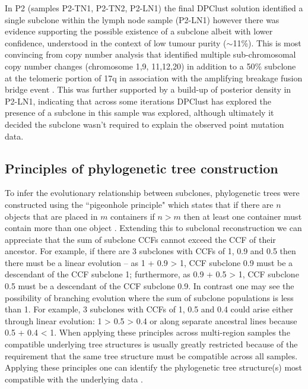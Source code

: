 In P2 (samples P2-TN1, P2-TN2, P2-LN1) the final DPClust solution identified a single subclone within the lymph node sample (P2-LN1) however there was evidence supporting the possible existence of a subclone albeit with lower confidence, understood in the context of low tumour purity ($\sim$11\%). This is most convincing from copy number analysis that identified multiple sub-chromosomal copy number changes (chromosome 1,9, 11,12,20) in addition to a 50\% subclone at the telomeric portion of 17q in association with the  amplifying breakage fusion bridge event . This was further supported by a build-up of posterior density in P2-LN1, indicating that across some iterations DPClust has explored the presence of a subclone in this sample was explored, although ultimately it decided the subclone wasn't required to explain the observed point mutation data.

\subsection{Principles of phylogenetic tree construction}

To infer the evolutionary relationship between subclones, phylogenetic trees were constructed using the ``pigeonhole principle" which states that if there are $n$ objects that are placed in $m$ containers if $n > m$ then at least one container must contain more than one object . Extending this to subclonal reconstruction we can appreciate that the sum of subclone \acp{CCF} cannot exceed the \ac{CCF} of their ancestor. For example, if there are 3 subclones with \acp{CCF} of 1, 0.9 and 0.5 then there must be a linear evolution – as 1 + 0.9 > 1, \ac{CCF} subclone 0.9 must be a descendant of the \ac{CCF} subclone 1; furthermore, as 0.9 + 0.5 > 1, \ac{CCF} subclone 0.5 must be a descendant of the \ac{CCF} subclone 0.9. In contrast one may see the possibility of branching evolution where the sum of subclone populations is less than 1. For example, 3 subclones with \acp{CCF} of 1, 0.5 and 0.4 could arise either through linear evolution: 1 > 0.5 > 0.4 or along separate ancestral lines because 0.5 + 0.4 < 1. When applying these principles across multi-region samples the compatible underlying tree structures is usually greatly restricted because of the requirement that the same tree structure must be compatible across all samples. Applying these principles one can identify the phylogenetic tree structure(s) most compatible with the underlying data . 

